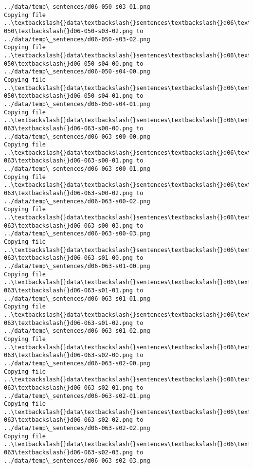 \documentclass[11pt]{article}
\begin{document}
\begin{Verbatim}[commandchars=\\\{\}]
../data/temp\_sentences/d06-050-s03-01.png
Copying file ..\textbackslash{}data\textbackslash{}sentences\textbackslash{}d06\textbackslash{}d06-050\textbackslash{}d06-050-s03-02.png to
../data/temp\_sentences/d06-050-s03-02.png
Copying file ..\textbackslash{}data\textbackslash{}sentences\textbackslash{}d06\textbackslash{}d06-050\textbackslash{}d06-050-s04-00.png to
../data/temp\_sentences/d06-050-s04-00.png
Copying file ..\textbackslash{}data\textbackslash{}sentences\textbackslash{}d06\textbackslash{}d06-050\textbackslash{}d06-050-s04-01.png to
../data/temp\_sentences/d06-050-s04-01.png
Copying file ..\textbackslash{}data\textbackslash{}sentences\textbackslash{}d06\textbackslash{}d06-063\textbackslash{}d06-063-s00-00.png to
../data/temp\_sentences/d06-063-s00-00.png
Copying file ..\textbackslash{}data\textbackslash{}sentences\textbackslash{}d06\textbackslash{}d06-063\textbackslash{}d06-063-s00-01.png to
../data/temp\_sentences/d06-063-s00-01.png
Copying file ..\textbackslash{}data\textbackslash{}sentences\textbackslash{}d06\textbackslash{}d06-063\textbackslash{}d06-063-s00-02.png to
../data/temp\_sentences/d06-063-s00-02.png
Copying file ..\textbackslash{}data\textbackslash{}sentences\textbackslash{}d06\textbackslash{}d06-063\textbackslash{}d06-063-s00-03.png to
../data/temp\_sentences/d06-063-s00-03.png
Copying file ..\textbackslash{}data\textbackslash{}sentences\textbackslash{}d06\textbackslash{}d06-063\textbackslash{}d06-063-s01-00.png to
../data/temp\_sentences/d06-063-s01-00.png
Copying file ..\textbackslash{}data\textbackslash{}sentences\textbackslash{}d06\textbackslash{}d06-063\textbackslash{}d06-063-s01-01.png to
../data/temp\_sentences/d06-063-s01-01.png
Copying file ..\textbackslash{}data\textbackslash{}sentences\textbackslash{}d06\textbackslash{}d06-063\textbackslash{}d06-063-s01-02.png to
../data/temp\_sentences/d06-063-s01-02.png
Copying file ..\textbackslash{}data\textbackslash{}sentences\textbackslash{}d06\textbackslash{}d06-063\textbackslash{}d06-063-s02-00.png to
../data/temp\_sentences/d06-063-s02-00.png
Copying file ..\textbackslash{}data\textbackslash{}sentences\textbackslash{}d06\textbackslash{}d06-063\textbackslash{}d06-063-s02-01.png to
../data/temp\_sentences/d06-063-s02-01.png
Copying file ..\textbackslash{}data\textbackslash{}sentences\textbackslash{}d06\textbackslash{}d06-063\textbackslash{}d06-063-s02-02.png to
../data/temp\_sentences/d06-063-s02-02.png
Copying file ..\textbackslash{}data\textbackslash{}sentences\textbackslash{}d06\textbackslash{}d06-063\textbackslash{}d06-063-s02-03.png to
../data/temp\_sentences/d06-063-s02-03.png

\end{Verbatim}
\end{document}
